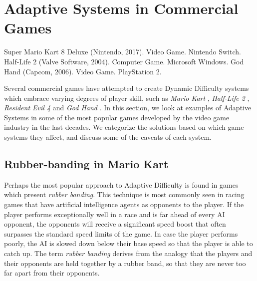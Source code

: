 \documentclass[cic,tc,english]{iiufrgs}
\begin{document}
\section{Adaptive Systems in Commercial Games}

     {Super Mario Kart 8 Deluxe (Nintendo, 2017). Video Game. Nintendo Switch.}
    {Half-Life 2 (Valve Software, 2004). Computer Game. Microsoft Windows.}
       {God Hand (Capcom, 2006). Video Game. PlayStation 2.}

Several commercial games have attempted to create Dynamic Difficulty systems which embrace varying degrees of player skill, such as \emph{Mario Kart} , \emph{Half-Life 2} , \emph{Resident Evil 4}  and \emph{God Hand} . In this section, we look at examples of Adaptive Systems in some of the most popular games developed by the video game industry in the last decades. We categorize the solutions based on which game systems they affect, and discuss some of the caveats of each system.

\subsection{Rubber-banding in Mario Kart}

Perhaps the most popular approach to Adaptive Difficulty is found in games which present \emph{rubber banding}. This technique is most commonly seen in racing games that have artificial intelligence agents as opponents to the player. If the player performs exceptionally well in a race and is far ahead of every AI opponent, the opponents will receive a significant speed boost that often surpasses the standard speed limits of the game. In case the player performs poorly, the AI is slowed down below their base speed so that the player is able to catch up. The term \emph{rubber banding} derives from the analogy that the players and their opponents are held together by a rubber band, so that they are never too far apart from their opponents.
\end{document}
